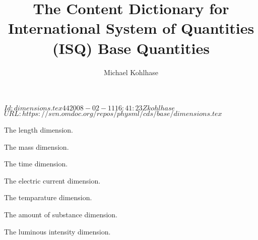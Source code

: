 \documentclass[twoside]{article}
\title{The Content Dictionary for International System of Quantities
  (ISQ) Base Quantities}
\author{Michael Kohlhase}
\begin{document}
\svnInfo $Id: dimensions.tex 44 2008-02-11 16:41:23Z kohlhase $
\svnKeyword $URL: https://svn.omdoc.org/repos/physml/cds/base/dimensions.tex $
\maketitle

\begin{module}[id=dimensions]

\begin{consymb}[name=length]
  The length dimension.
\end{consymb}

\begin{consymb}[name=mass]
  The mass dimension.
\end{consymb}

\begin{consymb}[name=time]
  The time dimension.
\end{consymb}

\begin{consymb}[name=electriccurrent]
  The electric current dimension.
\end{consymb} 

\begin{consymb}[name=temperature]
  The temparature dimension.
\end{consymb} 

\begin{consymb}[name=amountofsubstance]
  The amount of substance dimension.
\end{consymb} 

\begin{consymb}[name=luminousintensity]
  The luminous intensity dimension.
\end{consymb}

\end{module}
\end{document}
